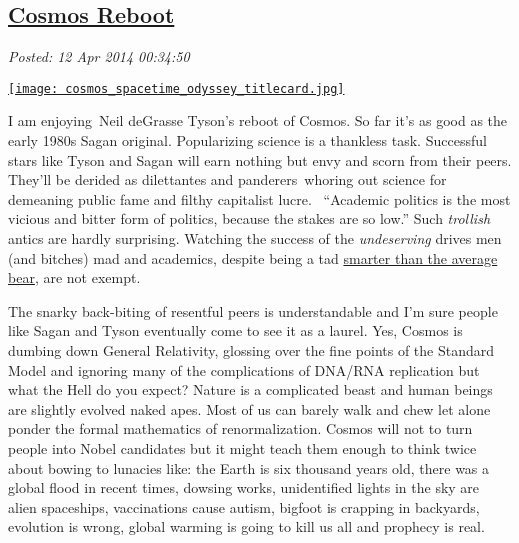 %

\subsection*{\href{https://bakerjd99.wordpress.com/2014/04/11/cosmos-reboot/}{Cosmos Reboot}}


\noindent\emph{Posted: 12 Apr 2014 00:34:50}
\vspace{6pt}

\captionsetup[floatingfigure]{labelformat=empty}
\begin{floatingfigure}[l]{0.25\textwidth}
\centering
\href{http://www.cosmosontv.com/}{\texttt{[image: cosmos\_spacetime\_odyssey\_titlecard.jpg]}}
\label{fig:4624X0}
\end{floatingfigure}I am enjoying~Neil deGrasse Tyson's reboot of Cosmos. So far it's as good
as the early 1980s Sagan original. Popularizing science is a thankless
task. Successful stars like Tyson and Sagan will earn nothing but envy
and scorn from their peers. They'll be derided as dilettantes and
panderers~whoring out science for demeaning public fame and filthy
capitalist lucre. ~``Academic politics is the most vicious and bitter
form of politics, because the stakes are so low.'' Such \emph{trollish}
antics are hardly surprising. Watching the success of the
\emph{undeserving} drives men (and bitches) mad and academics, despite
being a tad \href{https://www.youtube.com/watch?v=1pqyax6gwzQ}{smarter
than the average bear}, are not exempt.

The snarky back-biting of resentful peers is understandable and I'm sure
people like Sagan and Tyson eventually come to see it as a laurel. Yes,
Cosmos is dumbing down General Relativity, glossing over the fine points
of the Standard Model and ignoring many of the complications of DNA/RNA
replication but what the Hell do you expect? Nature is a complicated
beast and human beings are slightly evolved naked apes. Most of us can
barely walk and chew let alone ponder the formal mathematics of
renormalization. Cosmos will not to turn people into Nobel candidates
but it might teach them enough to think twice about bowing to lunacies
like: the Earth is six thousand years old, there was a global flood in
recent times, dowsing works, unidentified lights in the sky are alien
spaceships, vaccinations cause autism, bigfoot is crapping in backyards,
evolution is wrong, global warming is going to kill us all and prophecy
is real.

